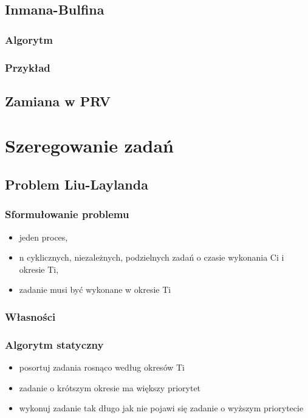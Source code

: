 \documentclass[12pt,a4paper]{article}
\begin{document}
\subsection{Inmana-Bulfina}
\subsubsection{Algorytm}
\subsubsection{Przykład}
\subsection{Zamiana w PRV}
\section{Szeregowanie zadań}
\subsection{Problem Liu-Laylanda}
\subsubsection{Sformułowanie problemu}
\begin{itemize}
\item jeden proces,
\item n cyklicznych, niezależnych, podzielnych zadań o czasie wykonania Ci i okresie Ti,
\item zadanie musi być wykonane w okresie Ti
\end{itemize}
\subsubsection{Własności}
\subsubsection{Algorytm statyczny}
\begin{itemize}
\item posortuj zadania rosnąco według okresów Ti
\item zadanie o krótszym okresie ma większy priorytet
\item wykonuj zadanie tak długo jak nie pojawi się zadanie o wyższym priorytecie
\end{itemize}
\end{document}
